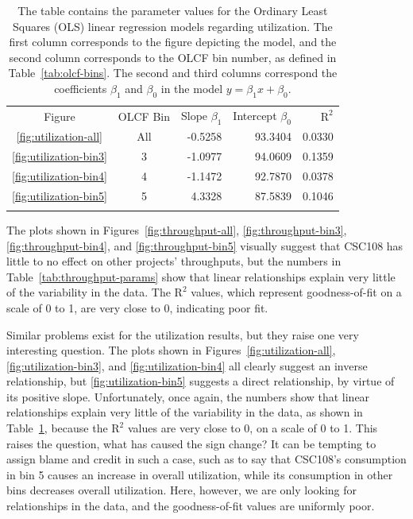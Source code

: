 \begin{table}
\caption{The table contains the parameter values for the Ordinary Least Squares
(OLS) linear regression models regarding utilization. The first column
corresponds to the figure depicting the model, and the second column
corresponds to the OLCF bin number, as defined in Table~\ref{tab:olcf-bins}.
The second and third columns correspond the coefficients $\beta_1$ and
$\beta_0$ in the model $y = \beta_{1}x + \beta_0$.}
\label{tab:utilization-params}       %
\begin{tabular}{ccrrr}
\hline\noalign{\smallskip}
Figure  & OLCF Bin & Slope $\beta_1$  & Intercept $\beta_0$  &  $\text{R}^2$ \\
\noalign{\smallskip}\hline\noalign{\smallskip}
\ref{fig:utilization-all}    &   All &  -0.5258 &   93.3404     &   0.0330  \\
\ref{fig:utilization-bin3}   &   3   &  -1.0977 &   94.0609     &   0.1359  \\
\ref{fig:utilization-bin4}   &   4   &  -1.1472 &   92.7870     &   0.0378  \\
\ref{fig:utilization-bin5}   &   5   &   4.3328 &   87.5839     &   0.1046  \\
\noalign{\smallskip}\hline
\end{tabular}
\end{table}

The plots shown in Figures~\ref{fig:throughput-all}, \ref{fig:throughput-bin3},
\ref{fig:throughput-bin4}, and \ref{fig:throughput-bin5} visually suggest that
CSC108 has little to no effect on other projects' throughputs, but the numbers
in Table~\ref{tab:throughput-params} show that linear relationships explain
very little of the variability in the data. The $\text{R}^2$ values, which
represent goodness-of-fit on a scale of 0 to 1, are very close to 0, indicating
poor fit.

Similar problems exist for the utilization results, but they raise one very
interesting question. The plots shown in Figures~\ref{fig:utilization-all},
\ref{fig:utilization-bin3}, and \ref{fig:utilization-bin4} all clearly suggest
an inverse relationship, but \ref{fig:utilization-bin5} suggests a direct
relationship, by virtue of its positive slope. Unfortunately, once again, the
numbers show that linear relationships explain very little of the variability
in the data, as shown in Table~\ref{tab:utilization-params}, because the
$\text{R}^2$ values are very close to 0, on a scale of 0 to 1. This raises the
question, what has caused the sign change? It can be tempting to assign blame
and credit in such a case, such as to say that CSC108's consumption in bin 5
causes an increase in overall utilization, while its consumption in other bins
decreases overall utilization. Here, however, we are only looking for
relationships in the data, and the goodness-of-fit values are uniformly poor. 

